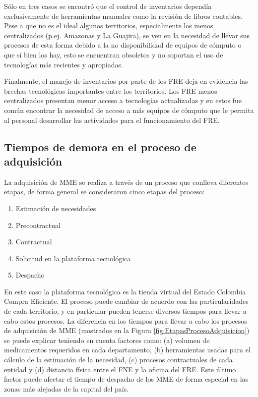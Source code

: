 \documentclass[
]{book}
\providecommand{\tightlist}{%
  \setlength{\itemsep}{0pt}\setlength{\parskip}{0pt}}
\begin{document}
Sólo en tres casos se encontró que el control de inventarios dependía exclusivamente de herramientas manuales como la revisión de libros contables. Pese a que no es el ideal algunos territorios, especialmente los menos centralizados (p.ej. Amazonas y La Guajira), se ven en la necesidad de llevar sus procesos de esta forma debido a la no disponibilidad de equipos de cómputo o que sí bien los hay, esto se encuentran obsoletos y no soportan el uso de tecnologías más recientes y apropiadas.

Finalmente, el manejo de inventarios por parte de los FRE deja en evidencia las brechas tecnológicas importantes entre los territorios. Los FRE menos centralizados presentan menor acceso a tecnologías actualizadas y en estos fue común encontrar la necesidad de acceso a más equipos de cómputo que le permita al personal desarrollar las actividades para el funcionamiento del FRE.

\hypertarget{tiempos-de-demora-en-el-proceso-de-adquisiciuxf3n}{%
\subsection{Tiempos de demora en el proceso de adquisición}\label{tiempos-de-demora-en-el-proceso-de-adquisiciuxf3n}}

La adquisición de MME se realiza a través de un proceso que conlleva diferentes etapas, de forma general se consideraron cinco etapas del proceso:

\begin{enumerate}
\def\labelenumi{\arabic{enumi}.}
\tightlist
\item
  Estimación de necesidades
\item
  Precontractual
\item
  Contractual
\item
  Solicitud en la plataforma tecnológica
\item
  Despacho
\end{enumerate}

En este caso la plataforma tecnológica es la tienda virtual del Estado Colombia Compra Eficiente. El proceso puede cambiar de acuerdo con las particularidades de cada territorio, y en particular pueden tenerse diversos tiempos para llevar a cabo estos procesos.
La diferencia en los tiempos para llevar a cabo los procesos de adquisición de MME (mostrados en la Figura \ref{fig:EtapasProcesoAdquisicion}) se puede explicar teniendo en cuenta factores como: (a) volumen de medicamentos requeridos en cada departamento, (b) herramientas usadas para el cálculo de la estimación de la necesidad, (c) procesos contractuales de cada entidad y (d) distancia física entre el FNE y la oficina del FRE. Este último factor puede afectar el tiempo de despacho de los MME de forma especial en las zonas más alejadas de la capital del país.
\end{document}
